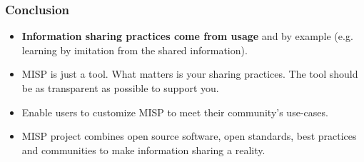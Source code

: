 \begin{frame}
        \frametitle{Conclusion}
        \begin{itemize}
                \item {\bf Information sharing practices come from usage} and by example (e.g. learning by imitation from the shared information).
                \item MISP is just a tool. What matters is your sharing practices. The tool should be as transparent as possible to support you.
                \item Enable users to customize MISP to meet their community's use-cases.
                \item MISP project combines open source software, open standards, best practices and communities to make information sharing a reality.
        \end{itemize}
\end{frame}
